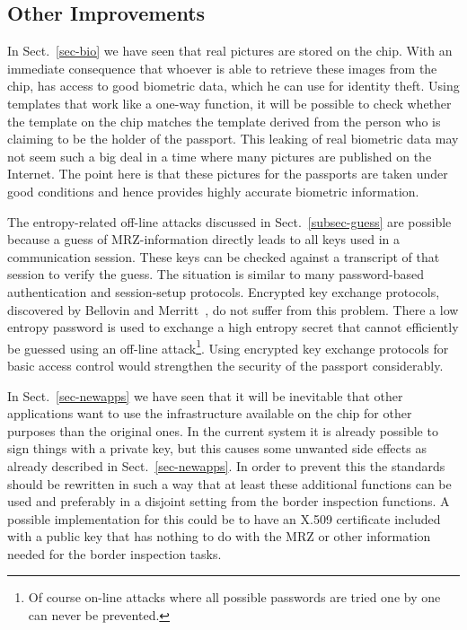 \documentclass[runningheads,envcountsame,envcountsect,oribibl]{llncs}
\begin{document}
\subsection{Other Improvements}

In Sect.~\ref{sec-bio} we have seen that real pictures are stored on the chip.
With an immediate consequence that whoever is able to retrieve these 
images from the chip, has access to good biometric data, which he can use
for identity theft. Using templates that work like a one-way function, it 
will be possible to check whether the template on the chip matches the
template derived from the person who is claiming to be the holder of the
passport.
This leaking of real biometric data may not seem such a big deal in a 
time where many pictures are published on the Internet.
The point here is that these pictures for the passports are taken under
good conditions and hence provides highly accurate biometric information.

The entropy-related off-line
attacks discussed in Sect.~\ref{subsec-guess} are possible
because a guess of MRZ-information directly leads to all keys used in a
communication session. These keys can be checked against a transcript of that
session to verify the guess. The situation is similar to many password-based
authentication and session-setup protocols. Encrypted key exchange protocols,
discovered by Bellovin and Merritt~\cite{BelM92}, do not suffer from this
problem. There a low entropy password is used to exchange a high entropy
secret that cannot efficiently be guessed using an off-line 
attack\footnote{Of course on-line attacks where all possible passwords are
  tried one by one can never be prevented.}.
Using encrypted key exchange protocols for basic access control
would strengthen the security of the passport considerably.

In Sect.~\ref{sec-newapps} we have seen that it will be inevitable
that other applications want to use the infrastructure available on the 
chip for other purposes than the original ones.
In the current system it is already possible to sign things with a private
key, but this causes some unwanted side effects as already described 
in Sect.~\ref{sec-newapps}.
In order to prevent this the standards should be rewritten in such a way that
at least these additional functions can be used and preferably in a disjoint
setting from the border inspection functions.
A possible implementation for this could be to have an X.509 certificate
included with a public key that has nothing to do with the MRZ or other
information needed for the border inspection tasks.


\end{document}
